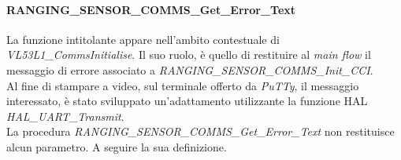 \documentclass[11pt]{report}
\begin{document}
\paragraph{RANGING\_SENSOR\_COMMS\_Get\_Error\_Text}
La funzione intitolante appare nell'ambito contestuale di \textit{VL53L1\_CommsInitialise}. Il suo ruolo, è quello di restituire al \textit{main flow} il messaggio di errore associato a \textit{RANGING\_SENSOR\_COMMS\_Init\_CCI}.\\
Al fine di stampare a video, sul terminale offerto da \textit{PuTTy}, il messaggio interessato, è stato sviluppato un'adattamento utilizzante la funzione HAL \textit{HAL\_UART\_Transmit}.\\
La procedura \textit{RANGING\_SENSOR\_COMMS\_Get\_Error\_Text} non restituisce alcun parametro.
A seguire la sua definizione.

\end{document}
